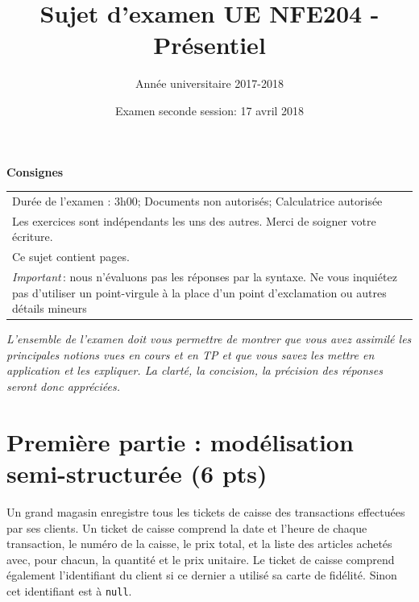 \documentclass[11pt,a4paper]{article}
\begin{document}
\title{Sujet d'examen UE NFE204 - Présentiel}
\author{Année universitaire 2017-2018}
\date{Examen seconde session: 17 avril 2018}

\maketitle

\begin{center}
{\bf \Large Consignes}\\
\begin{tabular}{| p{15cm} |}
\hline
Dur\'ee de l'examen : 3h00; Documents non autoris\'es;  Calculatrice autoris\'ee\\

Les exercices sont indépendants les uns des autres. Merci de soigner votre écriture.\\
Ce sujet contient \pageref{LastPage} pages.\\

\textit{Important}\,: nous n'évaluons pas les réponses par la syntaxe. Ne vous
inquiétez pas d'utiliser un point-virgule à la place d'un point d'exclamation ou
autres détails mineurs
\\
\hline
\end{tabular}
\end{center}

\emph{L'ensemble de l'examen doit vous permettre de montrer que vous avez assimilé les principales notions vues
en cours et en TP et que vous savez les mettre en application et les expliquer. La clarté, la concision,
la précision des réponses seront donc appréciées.}


\section*{Première partie : modélisation semi-structurée (6 pts)}

Un grand magasin enregistre tous les tickets de caisse des transactions effectuées par ses clients.
Un ticket de caisse comprend la date et l'heure de chaque transaction, le numéro de la caisse, le prix total,
et la liste des articles achetés avec, pour chacun, la quantité et le prix unitaire.  Le ticket de caisse comprend également
l'identifiant du client si ce dernier a utilisé sa carte de fidélité. Sinon cet identifiant
est à \texttt{null}.
\end{document}
